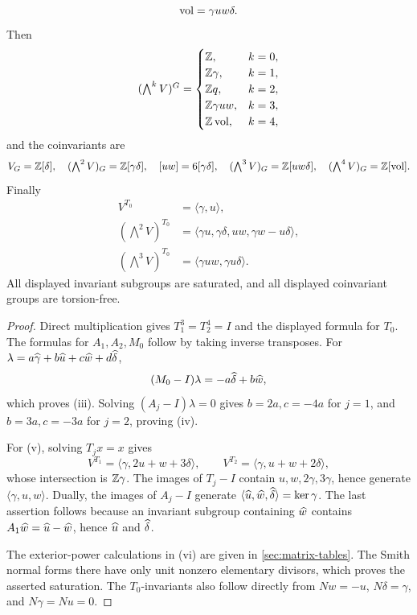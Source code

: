 \begin{proposition}
\begin{enumerate}[label=\textup{(\roman*)}]
\[ \operatorname{vol}=\gamma uw\delta.
\]
Then
\[
 (\textstyle\bigwedge^kV)^G=
 \begin{cases}
 \mathbb Z,&k=0,\\
 \mathbb Z\gamma,&k=1,\\
 \mathbb Z q,&k=2,\\
 \mathbb Z\gamma uw,&k=3,\\
 \mathbb Z\operatorname{vol},&k=4,
 \end{cases}
\]
and the coinvariants are
\[
 V_G=\mathbb Z[\delta],
 \quad
 (\textstyle\bigwedge^2V)_G=\mathbb Z[\gamma\delta],
 \quad [uw]=6[\gamma\delta],
 \quad
 (\textstyle\bigwedge^3V)_G=\mathbb Z[uw\delta],
 \quad
 (\textstyle\bigwedge^4V)_G=\mathbb Z[\operatorname{vol}].
\]
Finally
\[
\begin{aligned}
 V^{T_0}&=\langle\gamma,u\rangle,\\
 (\textstyle\bigwedge^2V)^{T_0}
 &=\langle\gamma u,\gamma\delta,uw,\gamma w-u\delta\rangle,\\
 (\textstyle\bigwedge^3V)^{T_0}
 &=\langle\gamma uw,\gamma u\delta\rangle.
\end{aligned}
\]
All displayed invariant subgroups are saturated, and all displayed
coinvariant groups are torsion-free.
\end{enumerate}
\end{proposition}

\begin{proof}
Direct multiplication gives $T_1^3=T_2^4=I$ and the displayed formula
for $T_0$.  The formulas for $A_1,A_2,M_0$ follow by taking inverse
transposes.  For
$\lambda=a\widehat\gamma+b\widehat u+c\widehat w+d\widehat\delta$,
\[
 (M_0-I)\lambda=-a\widehat\delta+b\widehat w,
\]
which proves (iii).  Solving $(A_j-I)\lambda=0$ gives
$b=2a,c=-4a$ for $j=1$, and $b=3a,c=-3a$ for $j=2$, proving (iv).

For (v), solving $T_jx=x$ gives
\[
 V^{T_1}=\langle\gamma,2u+w+3\delta\rangle,
 \qquad
 V^{T_2}=\langle\gamma,u+w+2\delta\rangle,
\]
whose intersection is $\mathbb Z\gamma$.  The images of $T_j-I$ contain
$u,w,2\gamma,3\gamma$, hence generate
$\langle\gamma,u,w\rangle$.  Dually, the images of $A_j-I$ generate
$\langle\widehat u,\widehat w,\widehat\delta\rangle=\ker\gamma$.  The last assertion
follows because an invariant subgroup containing $\widehat w$ contains
$A_1\widehat w=\widehat u-\widehat w$, hence $\widehat u$ and $\widehat\delta$.

The exterior-power calculations in (vi) are given in
\cref{sec:matrix-tables}.  The Smith normal forms there have only unit
nonzero elementary divisors, which proves the asserted saturation.  The
$T_0$-invariants also follow directly from
$Nw=-u$, $N\delta=\gamma$, and $N\gamma=Nu=0$.
\end{proof}


